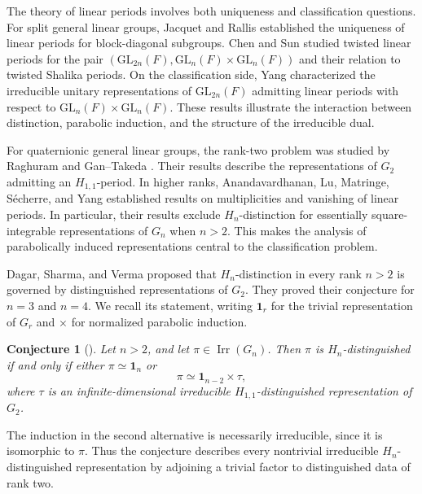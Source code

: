 \documentclass[11pt,leqno]{amsart}
\numberwithin{equation}{section}
\theoremstyle{plain}
\newtheorem{conjecture}[theorem]{Conjecture}
\theoremstyle{definition}
\theoremstyle{remark}
\DeclareMathOperator{\Irr}{Irr}
\newcommand{\one}{\mathbf{1}}
\begin{document}
	The theory of linear periods involves both uniqueness
	and classification questions.
	For split general linear groups, Jacquet and Rallis \cite{JR96} established the uniqueness of linear periods for block-diagonal subgroups.
	Chen and Sun \cite{CS20} studied twisted linear periods for the pair
	$(\mathrm{GL}_{2n}(F),
	\mathrm{GL}_n(F)\times\mathrm{GL}_n(F))$
	and their relation to twisted Shalika periods.
	On the classification side, Yang \cite{Yang22}
	characterized the irreducible unitary representations
	of $\mathrm{GL}_{2n}(F)$ admitting linear periods
	with respect to $\mathrm{GL}_n(F)\times\mathrm{GL}_n(F)$.
	These results illustrate the interaction between
	distinction, parabolic induction, and the structure
	of the irreducible dual.
	
	For quaternionic general linear groups, the rank-two
	problem was studied by Raghuram \cite{Raghuram}
	and Gan--Takeda \cite{GanTakeda}.
	Their results describe the representations of $G_2$
	admitting an $H_{1,1}$-period.
	In higher ranks, Anandavardhanan, Lu, Matringe,
	S\'echerre, and Yang \cite{ALMSY24} established results
	on multiplicities and vanishing of linear periods.
	In particular, their results exclude
	$H_n$-distinction for essentially square-integrable
	representations of $G_n$ when $n>2$.
	This makes the analysis of parabolically induced
	representations central to the classification problem.
	
	Dagar, Sharma, and Verma \cite{DSV} proposed that
	$H_n$-distinction in every rank $n>2$ is governed
	by distinguished representations of $G_2$.
	They proved their conjecture for $n=3$ and $n=4$.
	We recall its statement, writing $\one_r$ for
	the trivial representation of $G_r$ and $\times$
	for normalized parabolic induction.
	
	\begin{conjecture}[{\cite[Conjecture 1.1]{DSV}}]
		\label{conj:main}
		Let $n>2$, and let $\pi\in\Irr(G_n)$.
		Then $\pi$ is $H_n$-distinguished if and only if either
		$\pi\simeq\one_n$ or
		\[
		\pi\simeq\one_{n-2}\times\tau,
		\]
		where $\tau$ is an infinite-dimensional irreducible
		$H_{1,1}$-distinguished representation of $G_2$.
	\end{conjecture}
	
	The induction in the second alternative is necessarily
	irreducible, since it is isomorphic to $\pi$.
	Thus the conjecture describes every nontrivial irreducible
	$H_n$-distinguished representation by adjoining a trivial
	factor to distinguished data of rank two.
	
\end{document}
